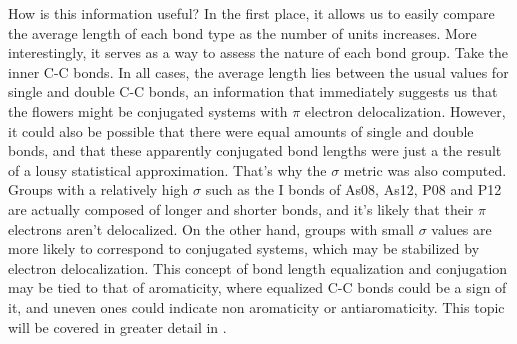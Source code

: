 How is this information useful?
In the first place, it allows us to easily compare the average length of each bond type as the number of units increases.
More interestingly, it serves as a way to assess the nature of each bond group.
Take the inner C-C bonds.
In all cases, the average length lies between the usual values for single and double C-C bonds, an information that immediately suggests us that the flowers might be conjugated systems with $\pi$ electron delocalization.
However, it could also be possible that there were equal amounts of single and double bonds, and that these apparently conjugated bond lengths were just a the result of a lousy statistical approximation.
That's why the $\sigma$ metric was also computed.
Groups with a relatively high $\sigma$ such as the I bonds of As08, As12, P08 and P12 are actually composed of longer and shorter bonds, and it's likely that their $\pi$ electrons aren't delocalized.
On the other hand, groups with small $\sigma$ values are more likely to correspond to conjugated systems, which may be stabilized by electron delocalization.
This concept of bond length equalization and conjugation may be tied to that of aromaticity, where equalized C-C bonds could be a sign of it, and uneven ones could indicate non aromaticity or antiaromaticity. This topic will be covered in greater detail in .


